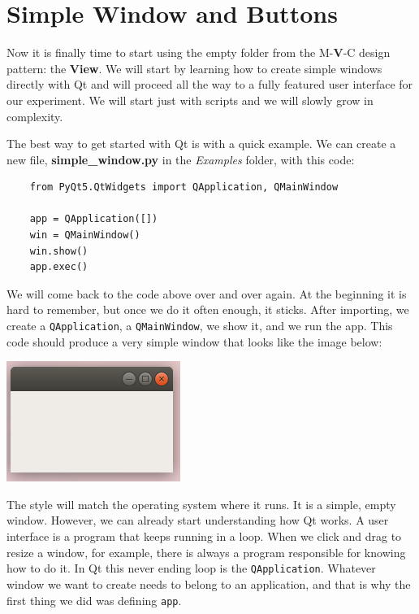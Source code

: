 \section{Simple Window and Buttons}\label{section:simple-window-andbuttons}
Now it is finally time to start using the empty folder from the M-\textbf{V}-C design pattern: the \textbf{View}. We will start by learning how to create simple windows directly with Qt and will proceed all the way to a fully featured user interface for our experiment. We will start just with scripts and we will slowly grow in complexity.

The best way to get started with Qt is with a quick example. We can create a new file, \textbf{simple\_window.py} in the \emph{Examples} folder, with this code:

\begin{verbatim}
    from PyQt5.QtWidgets import QApplication, QMainWindow

    app = QApplication([])
    win = QMainWindow()
    win.show()
    app.exec()
\end{verbatim}

We will come back to the code above over and over again. At the beginning it is hard to remember, but once we do it often enough, it sticks. After importing, we create a \texttt{QApplication}, a \texttt{QMainWindow}, we show it, and we run the app. This code should produce a very simple window that looks like the image below:

\begin{center}
    \includegraphics[width=.3\textwidth]{images/Chapter_08/01_simple_window.png}
\end{center}

The style will match the operating system where it runs. It is a simple, empty window. However, we can already start understanding how Qt works. A user interface is a program that keeps running in a loop. When we click and drag to resize a window, for example, there is always a program responsible for knowing how to do it. In Qt this never ending loop is the \texttt{QApplication}. Whatever window we want to create needs to belong to an application, and that is why the first thing we did was defining \texttt{app}.

